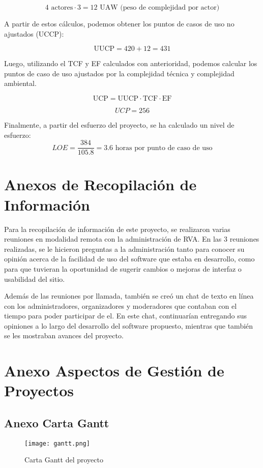 \[
 4 \text{ actores} \cdot 3 = 12 \text{ UAW} \text{ (peso de complejidad por actor)}
\]

A partir de estos cálculos, podemos obtener los puntos de casos de uso no ajustados (UCCP):

\[
\text{UUCP} = 420 + 12 = 431
\]

Luego, utilizando el TCF y EF calculados con anterioridad, podemos calcular los puntos de caso de uso ajustados por la complejidad técnica y complejidad ambiental.

\[
\text{UCP} = \text{UUCP} \cdot \text{TCF} \cdot \text{EF}
\]

\[
UCP = 256
\]


Finalmente, a partir del esfuerzo del proyecto, se ha calculado un nivel de esfuerzo:
\[
LOE = \frac{384}{105.8} = 3.6 \text{ horas por punto de caso de uso}
\]

\section{Anexos de Recopilación de Información}
Para la recopilación de información de este proyecto, se realizaron varias reuniones en modalidad remota con la administración de RVA. En las 3 reuniones realizadas, se le hicieron preguntas a la administración tanto para conocer su opinión acerca de la facilidad de uso del software que estaba en desarrollo, como para que tuvieran la oportunidad de sugerir cambios o mejoras de interfaz o usabilidad del sitio.

Además de las reuniones por llamada, también se creó un chat de texto en línea con los administradores, organizadores y moderadores que contaban con el tiempo para poder participar de el. En este chat, continuarían entregando sus opiniones a lo largo del desarrollo del software propuesto, mientras que también se les mostraban avances del proyecto.

\section{Anexo Aspectos de Gestión de Proyectos}

\subsection{Anexo Carta Gantt}

\begin{figure}[H]
  \begin{center}
    \texttt{[image: gantt.png]}
  \end{center}
  \caption[Carta Gantt del proyecto]{Carta Gantt del proyecto}
  \label{fig:gantt}
\end{figure}

